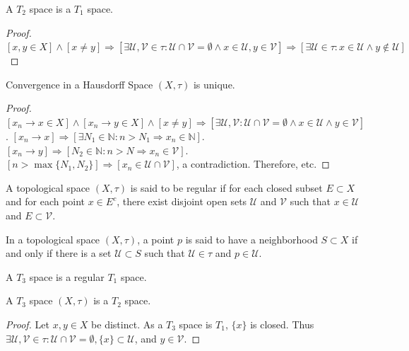 \documentclass[crop=false,class=book,oneside]{standalone}
\begin{document}
            \begin{theorem}
            A $T_2$ space is a $T_1$ space.
            \end{theorem}
            \begin{proof}
            $[x,y\in X]\land [x\ne y]\Rightarrow [\exists \mathcal{U},\mathcal{V}\in \tau:\mathcal{U}\cap \mathcal{V}=\emptyset\land x\in \mathcal{U},y\in \mathcal{V}]\Rightarrow [\exists \mathcal{U}\in \tau:x\in \mathcal{U}\land y\notin \mathcal{U}]$
            \end{proof}
            \begin{theorem}
            Convergence in a Hausdorff Space $(X,\tau)$ is unique.
            \end{theorem}
            \begin{proof}
            $[x_n \rightarrow x\in X]\land [x_n \rightarrow y\in X]\land[x\ne y]\Rightarrow [\exists \mathcal{U},\mathcal{V}:\mathcal{U}\cap \mathcal{V}=\emptyset\land x\in \mathcal{U}\land y\in \mathcal{V}]$. $[x_n\rightarrow x]\Rightarrow [\exists N_1\in \mathbb{N}:n>N_1\Rightarrow x_n \in \mathbb{N}]$. $[x_n\rightarrow y]\Rightarrow [N_2\in \mathbb{N}:n>N\Rightarrow x_n \in \mathcal{V}]$. $[n>\max\{N_1,N_2\}]\Rightarrow [x_n \in \mathcal{U}\cap \mathcal{V}]$, a contradiction. Therefore, etc.
            \end{proof}
            \begin{definition}
            A topological space $(X,\tau)$ is said to be regular if for each closed subset $E\subset X$ and for each point $x\in E^c$, there exist disjoint open sets $\mathcal{U}$ and $\mathcal{V}$ such that $x\in \mathcal{U}$ and $E\subset \mathcal{V}$.
            \end{definition} 
            \begin{definition}
            In a topological space $(X,\tau)$, a point $p$ is said to have a neighborhood $S\subset X$ if and only if there is a set $\mathcal{U}\subset S$ such that $\mathcal{U}\in \tau$ and $p\in \mathcal{U}$.
            \end{definition}
            \begin{definition}
            A $T_3$ space is a regular $T_1$ space.
            \end{definition}
            \begin{theorem}
            A $T_3$ space $(X,\tau)$ is a $T_2$ space.
            \end{theorem}
            \begin{proof}
            Let $x,y\in X$ be distinct. As a $T_3$ space is $T_1$, $\{x\}$ is closed. Thus $\exists \mathcal{U},\mathcal{V}\in\tau: \mathcal{U}\cap\mathcal{V}=\emptyset, \{x\}\subset \mathcal{U}$, and $y\in \mathcal{V}$.
            \end{proof}
\end{document}
